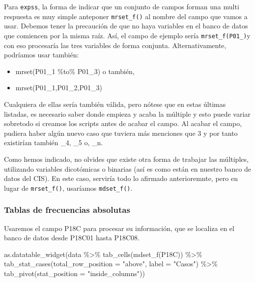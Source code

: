 \documentclass[
]{book}
\newenvironment{Shaded}{\begin{snugshade}}{\end{snugshade}}
\newcommand{\AttributeTok}[1]{\textcolor[rgb]{0.77,0.63,0.00}{#1}}
\newcommand{\FunctionTok}[1]{\textcolor[rgb]{0.00,0.00,0.00}{#1}}
\newcommand{\NormalTok}[1]{#1}
\newcommand{\SpecialCharTok}[1]{\textcolor[rgb]{0.00,0.00,0.00}{#1}}
\newcommand{\StringTok}[1]{\textcolor[rgb]{0.31,0.60,0.02}{#1}}
\providecommand{\tightlist}{%
  \setlength{\itemsep}{0pt}\setlength{\parskip}{0pt}}
\begin{document}
Para \texttt{expss}, la forma de indicar que un conjunto de campos forman una multi respuesta es muy simple anteponer \texttt{mrset\_f()} al nombre del campo que vamos a usar. Debemos tener la precaución de que no haya variables en el banco de datos que comiencen por la misma raíz. Así, el campo de ejemplo sería \texttt{mrset\_f(P01\_)}y con eso procesaría las tres variables de forma conjunta. Alternativamente, podríamos usar también:

\begin{itemize}
\tightlist
\item
  mrset(P01\_1 \%to\% P01\_3) o también,
\item
  mrset(P01\_1,P01\_2,P01\_3)
\end{itemize}

Cualquiera de ellas sería también válida, pero nótese que en estas últimas listadas, es necesario saber donde empieza y acaba la múltiple y esto puede variar sobretodo si creamos los scripts antes de acabar el campo. Al acabar el campo, pudiera haber algún nuevo caso que tuviera más menciones que 3 y por tanto existirían también \_4, \_5 o, \_n.

Como hemos indicado, no olvides que existe otra forma de trabajar las múltiples, utilizando variables dicotómicas o binarias (así es como están en nuestro banco de datos del CIS). En este caso, serviría todo lo afirmado anterioremnte, pero en lugar de \texttt{mrset\_f()}, usaríamos \texttt{mdset\_f()}.

\hypertarget{tablas-de-frecuencias-absolutas}{%
\subsubsection{Tablas de frecuencias absolutas}\label{tablas-de-frecuencias-absolutas}}

Usaremos el campo P18C para procesar su información, que se localiza en el banco de datos desde P18C01 hasta P18C08.

\begin{Shaded}
\begin{Highlighting}[]
\FunctionTok{as.datatable\_widget}\NormalTok{(data }\SpecialCharTok{\%\textgreater{}\%} \FunctionTok{tab\_cells}\NormalTok{(}\FunctionTok{mdset\_f}\NormalTok{(P18C)) }\SpecialCharTok{\%\textgreater{}\%} 
  \FunctionTok{tab\_stat\_cases}\NormalTok{(}\AttributeTok{total\_row\_position =} \StringTok{"above"}\NormalTok{, }\AttributeTok{label =} \StringTok{"Casos"}\NormalTok{) }\SpecialCharTok{\%\textgreater{}\%} 
  \FunctionTok{tab\_pivot}\NormalTok{(}\AttributeTok{stat\_position =} \StringTok{"inside\_columns"}\NormalTok{))}
\end{Highlighting}
\end{Shaded}
\end{document}
